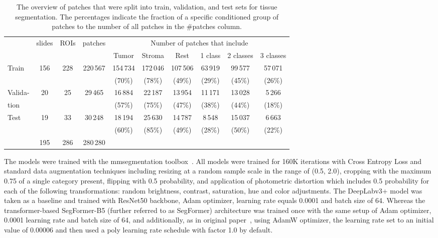\begin{table}[h!]
    \centering
    \begin{tabular}{ l c c c c c c c c c}
        \hline
        & \multirow{2}{*}{slides} & \multirow{2}{*}{ROIs}& \multirow{2}{*}{patches}& \multicolumn{6}{c}{Number of patches that include}\\ 
        \cline{5-10}
        & & & & Tumor & Stroma & Rest & 1 class & 2 classes & 3 classes\\
        \hline
        Train & 156 & 228 & 220\,567 & 154\,734 & 172\,046 & 107\,506 & 63\,919 & 99\,577 & 57\,071 \\
         &  &  &  & (70\%) & (78\%) & (49\%) & (29\%) & (45\%) & (26\%) \\
        Valida- & 20 & 25 & 29\,465 & 16\,884 & 22\,187 & 13\,954 & 11\,171 & 13\,028 & 5\,266 \\
        tion &  &  &  & (57\%) & (75\%) & (47\%) & (38\%) & (44\%) & (18\%)\\
        Test & 19 & 33 & 30\,248 & 18\,194 & 25\,630 & 14\,787 & 8\,548 & 15\,037 & 6\,663\\
         &  &  &  & (60\%) & (85\%) & (49\%) & (28\%) & (50\%) & (22\%)\\
        \hline
        & 195 & 286 & 280\,280 &  &  &  & & & \\
    \end{tabular}
    \caption{\label{tab:patch_sep} The overview of patches that were split into train, validation,
    and test sets for tissue segmentation. The percentages indicate the fraction of a specific conditioned group of patches to the number of all patches in the \#patches column.}
\end{table}

The models were trained with the mmsegmentation toolbox~\cite{mmseg2020}. 
All models were trained for 160K iterations with Cross Entropy Loss and
standard data augmentation techniques including resizing at a random sample scale in the range
of (0.5, 2.0), cropping with the maximum 0.75 of a single category present, flipping with 0.5 probability,
and application of photometric distortion which includes 0.5 probability for each of the following transformations: random brightness, contrast, saturation, hue and color adjustments. 
The DeepLabv3+ model was taken as a baseline and trained with ResNet50 backbone,
Adam optimizer, learning rate equals 0.0001 and batch size of 64. Whereas the
transformer-based SegFormer-B5 (further referred to as SegFormer) architecture was trained once with the same setup of
Adam optimizer, 0.0001 learning rate and batch size of 64, and additionally, as 
in original paper~\cite*{xie2021segformer}, using AdamW optimizer, the learning rate
set to an initial value of 0.00006 and then used a poly learning rate schedule with
factor 1.0 by default.

